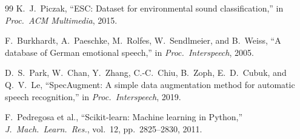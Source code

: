 \documentclass[oneside,openany]{final_report}
\begin{document}
\begin{thebibliography}{99}
 K.\ J.\ Piczak, ``ESC: Dataset for environmental sound classification,'' in \emph{Proc.\ ACM Multimedia}, 2015.

 F.\ Burkhardt, A.\ Paeschke, M.\ Rolfes, W.\ Sendlmeier, and B.\ Weiss, ``A database of German emotional speech,'' in \emph{Proc.\ Interspeech}, 2005.

 D.\ S.\ Park, W.\ Chan, Y.\ Zhang, C.-C.\ Chiu, B.\ Zoph, E.\ D.\ Cubuk, and Q.\ V.\ Le, ``SpecAugment: A simple data augmentation method for automatic speech recognition,'' in \emph{Proc.\ Interspeech}, 2019.

 F.\ Pedregosa et al., ``Scikit-learn: Machine learning in Python,'' \emph{J.\ Mach.\ Learn.\ Res.}, vol.~12, pp.~2825--2830, 2011.

\end{thebibliography}
\label{endpage}
\end{document}

